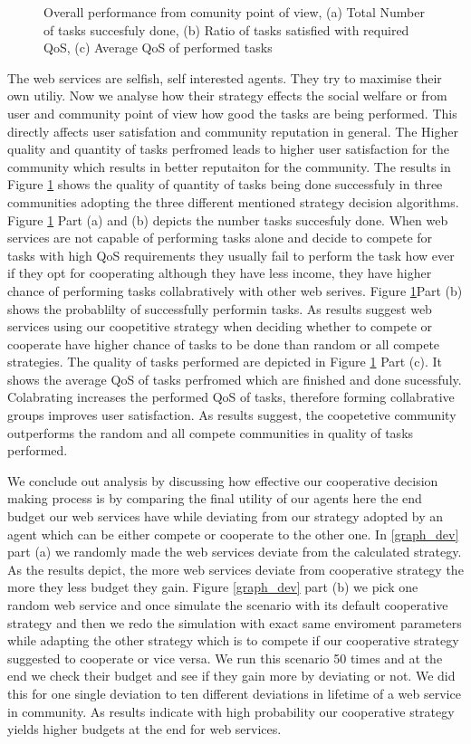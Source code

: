 \documentclass[fleqn]{singlecol-new}
\begin{document}
\begin{figure}
\caption{Overall performance from comunity point of view, (a) Total Number of tasks succesfuly done, (b) Ratio of tasks satisfied with required QoS, (c) Average QoS of performed tasks} \label{graph_task}
\end{figure}

The web services are selfish, self interested agents. They try to maximise their own utiliy. Now we analyse how their strategy effects the social welfare or from user and community point of view how good the tasks are being performed. This directly affects user satisfation and community reputation in general. The Higher  quality and quantity of tasks perfromed leads to higher user satisfaction for the community which results in better reputaiton for the community. The results in Figure \ref{graph_task} shows the quality of quantity of tasks being done successfuly in three communities adopting the three different mentioned strategy decision algorithms. Figure \ref{graph_task} Part (a) and (b) depicts the number tasks succesfuly done. When web services are not capable of performing tasks alone and decide to compete for tasks with high QoS requirements they usually fail to perform the task how ever if they opt for cooperating although they have less income, they have higher chance of performing tasks collabratively with other web serives. Figure \ref{graph_task}Part (b) shows the probablilty of successfully performin tasks. As results suggest web services using our coopetitive strategy when deciding whether to compete or cooperate have higher chance of tasks to be done than random or all compete strategies. The quality of tasks performed are depicted in Figure \ref{graph_task} Part (c). It shows the average QoS of tasks perfromed which are finished and done sucessfuly. Colabrating increases the performed QoS of tasks, therefore forming collabrative groups improves user satisfaction. As results suggest, the coopetetive community outperforms the random and all compete communities in quality of tasks performed.


We conclude out analysis by discussing how effective our cooperative decision making process is by comparing the final utility of our agents here the end budget our web services have while deviating from our strategy adopted by an agent which can be either compete or cooperate to the other one. In \ref{graph_dev} part (a) we randomly made the web services deviate from the calculated strategy. As the results depict, the more web services deviate from cooperative strategy the more they less budget they gain. Figure \ref{graph_dev} part (b) we pick one random web service and once simulate the scenario with its default cooperative strategy and then we redo the simulation with exact same enviroment parameters while adapting the other strategy which is to compete if our cooperative strategy suggested to cooperate or vice versa. We run this scenario 50 times and at the end we check their budget and see if they gain more by deviating or not. We did this for one single deviation to ten different deviations in lifetime of a web service in community. As results indicate with high probability our cooperative strategy yields higher budgets at the end for web services.
\end{document}
